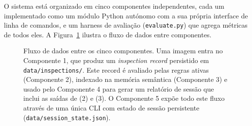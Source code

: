\documentclass[conference]{IEEEtran}
\begin{document}
O sistema está organizado em cinco componentes independentes, cada um
implementado como um módulo Python autónomo com a sua própria interface de
linha de comandos, e um harness de avaliação (\texttt{evaluate.py}) que
agrega métricas de todos eles. A Figura~\ref{fig:arquitetura} ilustra o
fluxo de dados entre componentes.

\begin{figure}[h]
\centering
{}
\caption{Fluxo de dados entre os cinco componentes. Uma imagem entra no
Componente 1, que produz um \textit{inspection record} persistido em
\texttt{data/inspections/}. Este record é avaliado pelas regras ativas
(Componente 2), indexado na memória semântica (Componente 3) e usado pelo
Componente 4 para gerar um relatório de sessão que inclui as saídas de (2) e
(3). O Componente 5 expõe todo este fluxo através de uma única CLI com
estado de sessão persistente (\texttt{data/session\_state.json}).}
\label{fig:arquitetura}
\end{figure}
\end{document}
